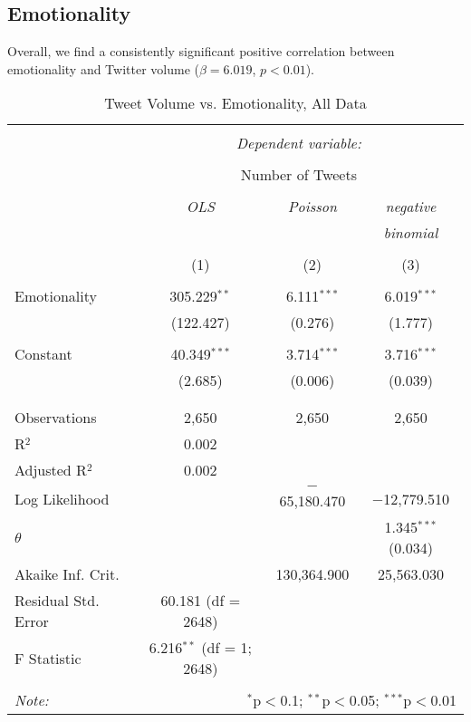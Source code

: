 \subsection{Emotionality}
Overall, we find a consistently significant positive correlation between emotionality and Twitter volume ($\beta=6.019$, $p<0.01$). 

\begin{table}[!htbp] \centering 
  \caption{Tweet Volume vs. Emotionality, All Data} 
  \label{} 
    \begin{tabular}{@{\extracolsep{5pt}}lccc} 
    \\[-1.8ex]\hline 
    \hline \\[-1.8ex] 
     & \multicolumn{3}{c}{\textit{Dependent variable:}} \\ 
    \cline{2-4} 
    \\[-1.8ex] & \multicolumn{3}{c}{Number of Tweets} \\ 
    \\[-1.8ex] & \textit{OLS} & \textit{Poisson} & \textit{negative} \\ 
     & \textit{} & \textit{} & \textit{binomial} \\ 
    \\[-1.8ex] & (1) & (2) & (3)\\ 
    \hline \\[-1.8ex] 
     Emotionality & 305.229$^{**}$ & 6.111$^{***}$ & 6.019$^{***}$ \\ 
      & (122.427) & (0.276) & (1.777) \\ 
      & & & \\ 
     Constant & 40.349$^{***}$ & 3.714$^{***}$ & 3.716$^{***}$ \\ 
      & (2.685) & (0.006) & (0.039) \\ 
      & & & \\ 
    \hline \\[-1.8ex] 
    Observations & 2,650 & 2,650 & 2,650 \\ 
    R$^{2}$ & 0.002 &  &  \\ 
    Adjusted R$^{2}$ & 0.002 &  &  \\ 
    Log Likelihood &  & $-$65,180.470 & $-$12,779.510 \\ 
    $\theta$ &  &  & 1.345$^{***}$  (0.034) \\ 
    Akaike Inf. Crit. &  & 130,364.900 & 25,563.030 \\ 
    Residual Std. Error & 60.181 (df = 2648) &  &  \\ 
    F Statistic & 6.216$^{**}$ (df = 1; 2648) &  &  \\ 
    \hline 
    \hline \\[-1.8ex] 
    \textit{Note:}  & \multicolumn{3}{r}{$^{*}$p$<$0.1; $^{**}$p$<$0.05; $^{***}$p$<$0.01} \\ 
    \end{tabular} 
\end{table} 

